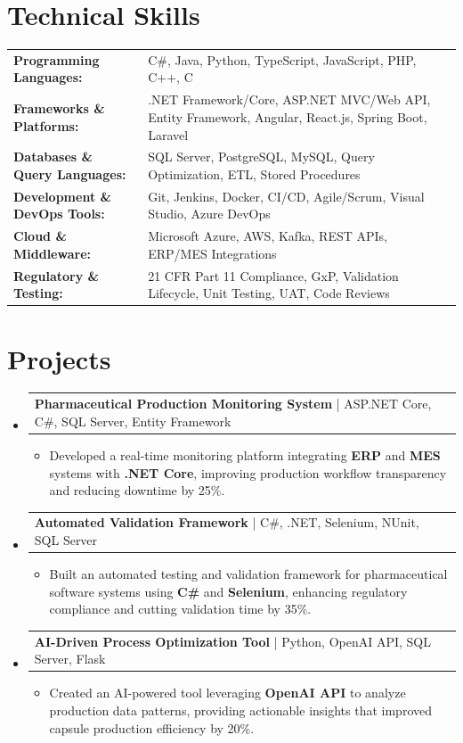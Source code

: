 \documentclass[letterpaper,10pt]{article}
\makeatletter
\newcommand{\resumeItem}[1]{
  \item{\fontsize{8pt}{9pt}\selectfont
    #1 \vspace{-3pt}
  }
}
\newcommand{\resumeProjectHeading}[2]{
    \item
    \begin{tabular*}{1.001\textwidth}{l@{\extracolsep{\fill}}r}
      \fontsize{8.5pt}{10pt}#1 & \textbf{\fontsize{8.5pt}{10pt} #2}\\
    \end{tabular*}\vspace{-7pt}
}
\newcommand{\resumeSubHeadingListStart}{\begin{itemize}[leftmargin=0pt, label={}]}
\newcommand{\resumeSubHeadingListEnd}{\end{itemize}}
\newcommand{\resumeItemListStart}{\begin{itemize}[leftmargin=*]}
\newcommand{\resumeItemListEnd}{\end{itemize}\vspace{-5pt}}
\makeatother
\begin{document}
\section{Technical Skills}
        \vspace{-14pt}
        \begin{table}[h]
            \fontsize{8pt}{9pt}\selectfont
            \begin{tabular}{p{0.3\linewidth} p{0.7\linewidth}}
                \textbf{Programming Languages:} & C\#, Java, Python, TypeScript, JavaScript, PHP, C++, C \\
                \textbf{Frameworks \& Platforms:} & .NET Framework/Core, ASP.NET MVC/Web API, Entity Framework, Angular, React.js, Spring Boot, Laravel \\
                \textbf{Databases \& Query Languages:} & SQL Server, PostgreSQL, MySQL, Query Optimization, ETL, Stored Procedures \\
                \textbf{Development \& DevOps Tools:} & Git, Jenkins, Docker, CI/CD, Agile/Scrum, Visual Studio, Azure DevOps \\
                \textbf{Cloud \& Middleware:} & Microsoft Azure, AWS, Kafka, REST APIs, ERP/MES Integrations \\
                \textbf{Regulatory \& Testing:} & 21 CFR Part 11 Compliance, GxP, Validation Lifecycle, Unit Testing, UAT, Code Reviews \\
            \end{tabular}
        \end{table}
 \vspace{-18pt}

\section{Projects}
    \vspace{-5pt}
    \resumeSubHeadingListStart
          \resumeProjectHeading
            {\textbf{Pharmaceutical Production Monitoring System} | ASP.NET Core, C\#, SQL Server, Entity Framework}{}
            \resumeItemListStart
                \resumeItem{Developed a real-time monitoring platform integrating \textbf{ERP} and \textbf{MES} systems with \textbf{.NET Core}, improving production workflow transparency and reducing downtime by 25\%.}
            \resumeItemListEnd
        \vspace{-12pt}
    
        \resumeProjectHeading
            {\textbf{Automated Validation Framework} | C\#, .NET, Selenium, NUnit, SQL Server}{}
        \resumeItemListStart
                \resumeItem{Built an automated testing and validation framework for pharmaceutical software systems using \textbf{C\#} and \textbf{Selenium}, enhancing regulatory compliance and cutting validation time by 35\%.}
        \resumeItemListEnd
      \vspace{-12pt}
      \resumeProjectHeading
        {\textbf{AI-Driven Process Optimization Tool} | Python, OpenAI API, SQL Server, Flask}{}
    \resumeItemListStart
            \resumeItem{Created an AI-powered tool leveraging \textbf{OpenAI API} to analyze production data patterns, providing actionable insights that improved capsule production efficiency by 20\%.}
    \resumeItemListEnd
    \resumeSubHeadingListEnd
\end{document}
